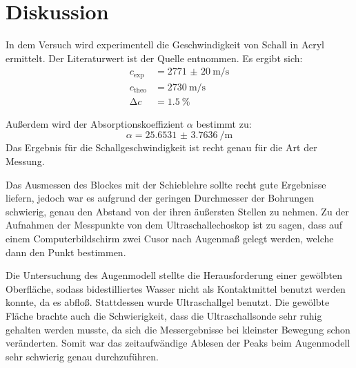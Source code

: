 \section{Diskussion}
\label{sec:Diskussion}

In dem Versuch wird experimentell die Geschwindigkeit von Schall in Acryl ermittelt. Der Literaturwert ist der Quelle \cite{cA} entnommen.
Es ergibt sich:
\begin{align*}
    c_{\text{exp}}    &= \SI{2771(20)}{\metre\per\second} \\
    c_{\text{theo}}   &= \SI{2730}{\metre\per\second} \\
    \increment c      &= \SI{1.5}{\percent}
\end{align*}

\noindent Außerdem wird der Absorptionskoeffizient $\alpha $ bestimmt zu:
\begin{equation*}
    \alpha = \SI{25.6531(37636)}{\per\metre}
\end{equation*}
Das Ergebnis für die Schallgeschwindigkeit ist recht genau für die Art der Messung. 

\noindent Das Ausmessen des Blockes mit der Schieblehre sollte recht gute Ergebnisse liefern, jedoch war es aufgrund der geringen Durchmesser der Bohrungen schwierig, 
genau den Abstand von der ihren äußersten Stellen zu nehmen. Zu der Aufnahmen der Messpunkte von dem Ultraschallechoskop ist zu sagen, dass auf einem 
Computerbildschirm zwei Cusor nach Augenmaß gelegt werden, welche dann den Punkt bestimmen. 


\noindent Die Untersuchung des Augenmodell stellte die Herausforderung einer gewölbten Oberfläche, sodass bidestilliertes Wasser nicht als Kontaktmittel benutzt 
werden konnte, da es abfloß. Stattdessen wurde Ultraschallgel benutzt. Die gewölbte Fläche brachte auch die Schwierigkeit, dass die Ultraschallsonde sehr ruhig 
gehalten werden musste, da sich die Messergebnisse bei kleinster Bewegung schon veränderten. Somit war das zeitaufwändige Ablesen der Peaks beim Augenmodell
sehr schwierig genau durchzuführen. 